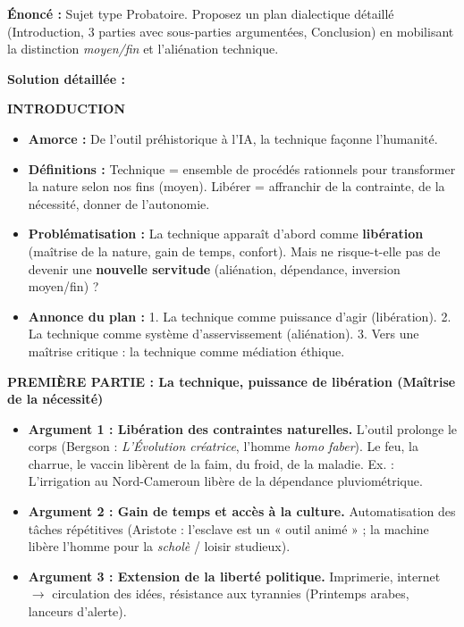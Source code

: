 \documentclass[11pt]{article}
\begin{document}
\begin{exoresolu}
\textbf{Énoncé :} Sujet type Probatoire. Proposez un plan dialectique détaillé (Introduction, 3 parties avec sous-parties argumentées, Conclusion) en mobilisant la distinction \emph{moyen/fin} et l'aliénation technique.

\tcblower
\textbf{Solution détaillée :}

\textbf{INTRODUCTION}
\begin{itemize}
    \item \textbf{Amorce :} De l'outil préhistorique à l'IA, la technique façonne l'humanité.
    \item \textbf{Définitions :} Technique = ensemble de procédés rationnels pour transformer la nature selon nos fins (moyen). Libérer = affranchir de la contrainte, de la nécessité, donner de l'autonomie.
    \item \textbf{Problématisation :} La technique apparaît d'abord comme \textbf{libération} (maîtrise de la nature, gain de temps, confort). Mais ne risque-t-elle pas de devenir une \textbf{nouvelle servitude} (aliénation, dépendance, inversion moyen/fin) ?
    \item \textbf{Annonce du plan :} 1. La technique comme puissance d'agir (libération). 2. La technique comme système d'asservissement (aliénation). 3. Vers une maîtrise critique : la technique comme médiation éthique.
\end{itemize}

\textbf{PREMIÈRE PARTIE : La technique, puissance de libération (Maîtrise de la nécessité)}
\begin{itemize}
    \item \textbf{Argument 1 : Libération des contraintes naturelles.} L'outil prolonge le corps (Bergson : \emph{L'Évolution créatrice}, l'homme \emph{homo faber}). Le feu, la charrue, le vaccin libèrent de la faim, du froid, de la maladie. Ex. : L'irrigation au Nord-Cameroun libère de la dépendance pluviométrique.
    \item \textbf{Argument 2 : Gain de temps et accès à la culture.} Automatisation des tâches répétitives (Aristote : l'esclave est un « outil animé » ; la machine libère l'homme pour la \emph{scholè} / loisir studieux).
    \item \textbf{Argument 3 : Extension de la liberté politique.} Imprimerie, internet $\rightarrow$ circulation des idées, résistance aux tyrannies (Printemps arabes, lanceurs d'alerte).
\end{itemize}


\end{exoresolu}
\end{document}
